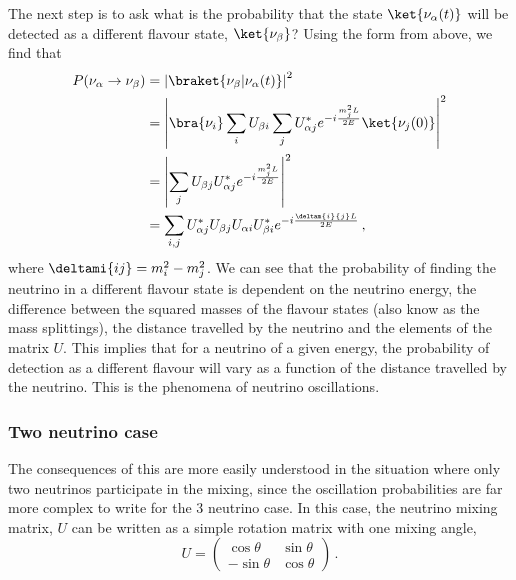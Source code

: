 The next step is to ask what is the probability that the state $\ket{\nu_{\alpha}(t)}$ will be detected as a different flavour state, $\ket{\nu_{\beta}}$?
Using the form from above, we find that
\begin{align}
  P(\nu_{\alpha} \rightarrow \nu_{\beta}) &= \left|\braket{\nu_{\beta} | \nu_{\alpha}(t)} \right|^{2} \\
  &=  \left| \bra{\nu_{i}} \sum_{i} U_{\beta i} \sum_{j} U^{*}_{\alpha j} e^{-i \frac{m^{2}_{j}L}{2E}} \ket{\nu_{j}(0)} \right|^{2} \\
  &= \left| \sum_{j} U_{\beta j} U_{\alpha j}^{*} e^{-i \frac{m^{2}_{j}L}{2E}} \right|^{2} \\
  &= \sum_{i, j} U^{*}_{\alpha j} U_{\beta j} U_{\alpha i} U^{*}_{\beta i} e^{-i \frac{\deltam{i}{j}L}{2E}}  \, , 
  \label{eq:oscillationProb}
\end{align}
where $\deltami{ij} = m_{i}^{2} - m_{j}^{2}$.
We can see that the probability of finding the neutrino in a different flavour state is dependent on the neutrino energy, the difference between the squared masses of the flavour states (also know as the mass splittings), the distance travelled by the neutrino and the elements of the matrix $U$.
This implies that for a neutrino of a given energy, the probability of detection as a different flavour will vary as a function of the distance travelled by the neutrino.
This is the phenomena of neutrino oscillations.

\subsubsection{Two neutrino case}
\label{sec:theory:theory:twoNeutrino}
The consequences of this are more easily understood in the situation where only two neutrinos participate in the mixing, since the oscillation probabilities are far more complex to write for the 3 neutrino case.
In this case, the neutrino mixing matrix, $U$ can be written as a simple rotation matrix with one mixing angle,
\begin{equation}
  U =
  \begin{pmatrix}
    \cos\theta  & \sin\theta \\
    -\sin\theta & \cos\theta
  \end{pmatrix} \, .
\end{equation}


